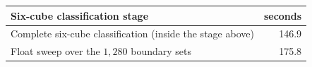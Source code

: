 \begin{tabular}{lr}
\toprule
Six-cube classification stage & seconds\\
\midrule
Complete six-cube classification (inside the stage above) & 146.9\\
Float sweep over the $1{,}280$ boundary sets & 175.8\\
\bottomrule
\end{tabular}
